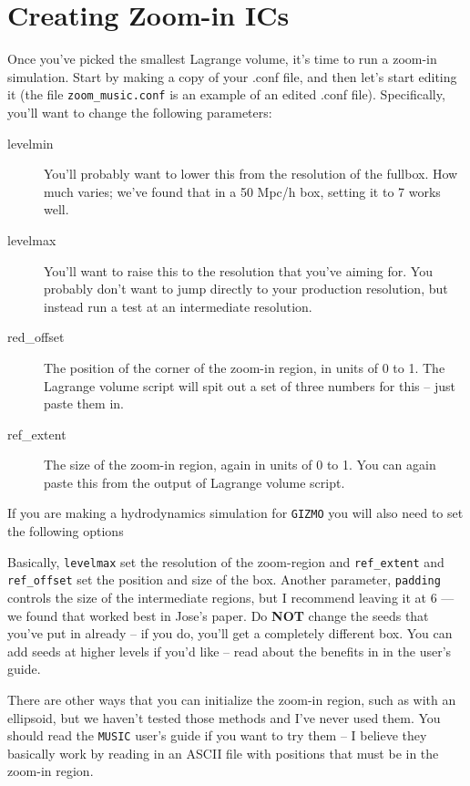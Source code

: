 \documentclass[10pt,a4paper,onecolumn]{article}
\begin{document}
\section{Creating Zoom-in ICs}
Once you've picked the smallest Lagrange volume, it's time to run a zoom-in simulation.
Start by making a copy of your .conf file, and then let's start editing it (the file 
\texttt{zoom\_music.conf} is an example of an edited .conf file).  Specifically,
you'll want to change the following parameters:
\begin{description}
\item[levelmin]  You'll probably want to lower this from the resolution of the fullbox.
How much varies; we've found that in a 50 Mpc/h box, setting it to 7 works well.
\item[levelmax]  You'll want to raise this to the resolution that you've aiming for.
You probably don't want to jump directly to your production resolution, but instead
run a test at an intermediate resolution.
\item[red\_offset] The position of the corner of the zoom-in region, in units of 0 to 1.
The Lagrange volume script will spit out a set of three numbers for this -- just paste them in.
\item[ref\_extent] The size of the zoom-in region, again in units of 0 to 1.  You can again
paste this from the output of Lagrange volume script.
\end{description}

If you are making a hydrodynamics simulation for \texttt{GIZMO} you will also need to set the following options 

Basically, \texttt{levelmax} set the resolution of the zoom-region and \texttt{ref\_extent} 
and \texttt{ref\_offset} set the position and size of the box.  Another parameter, \texttt{padding}
controls the size of the intermediate regions, but I recommend leaving it at 6 --- we found
that worked best in Jose's paper.  Do \textbf{NOT} change the seeds that you've put in 
already -- if you do, you'll get a completely different box.  You can add seeds at higher levels
if you'd like -- read about the benefits in in the user's guide.

There are other ways that you can initialize the zoom-in region, such as with an ellipsoid,
but we haven't tested those methods and I've never used them.  You should read the 
\texttt{MUSIC} user's guide if you want to try them -- I believe they basically work by 
reading in an ASCII file with positions that must be in the zoom-in region.
\end{document}
